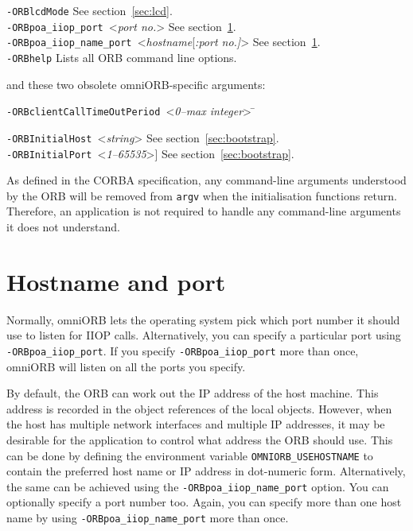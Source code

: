 \documentclass[11pt,twoside,a4paper]{book}
\newcommand{\code}[1]{\texttt{#1}}
\newcommand{\cmdline}[1]{\texttt{#1}}
\begin{document}
\begin{tabbing}
\cmdline{-ORBlcdMode}                    \> See section~\ref{sec:lcd}.\\

\cmdline{-ORBpoa\_iiop\_port }<\textit{port no.}>
                                         \> See section~\ref{sec:nameport}.\\

\cmdline{-ORBpoa\_iiop\_name\_port }<\textit{hostname}[\textit{:port no.]}>
                                         \> See section~\ref{sec:nameport}.\\

\cmdline{-ORBhelp}                     \> Lists all ORB command line options.

\end{tabbing}

\noindent and these two obsolete omniORB-specific arguments:

\begin{tabbing}
\cmdline{-ORBclientCallTimeOutPeriod }<\textit{0--max integer}> \=\kill

\cmdline{-ORBInitialHost }<\textit{string}>
                                         \> See section~\ref{sec:bootstrap}.\\

\cmdline{-ORBInitialPort }<\textit{1--65535}>]
                                         \> See section~\ref{sec:bootstrap}.

\end{tabbing}


\noindent As defined in the CORBA specification, any command-line
arguments understood by the ORB will be removed from \code{argv} when
the initialisation functions return. Therefore, an application is not
required to handle any command-line arguments it does not understand.



\section{Hostname and port}
\label{sec:nameport}

Normally, omniORB lets the operating system pick which port number it
should use to listen for IIOP calls. Alternatively, you can specify a
particular port using \cmdline{-ORBpoa\_iiop\_port}. If you specify
\cmdline{-ORBpoa\_iiop\_port} more than once, omniORB will listen on
all the ports you specify.

By default, the ORB can work out the IP address of the host machine.
This address is recorded in the object references of the local
objects. However, when the host has multiple network interfaces and
multiple IP addresses, it may be desirable for the application to
control what address the ORB should use. This can be done by defining
the environment variable \code{OMNIORB\_USEHOSTNAME} to contain the
preferred host name or IP address in dot-numeric form. Alternatively,
the same can be achieved using the \cmdline{-ORBpoa\_iiop\_name\_port}
option. You can optionally specify a port number too. Again, you can
specify more than one host name by using
\cmdline{-ORBpoa\_iiop\_name\_port} more than once.
\end{document}
